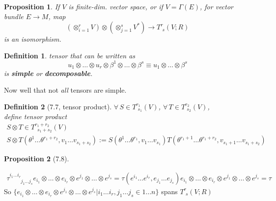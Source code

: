 \documentclass[10pt]{amsart}
\newtheorem{proposition}{Proposition}
\newtheorem{definition}{Definition}
\begin{document}
\begin{multicols*}{2}
\begin{proposition}
If $V$ is finite-dim. vector space, or if $V=\Gamma(E)$, for vector bundle $E\to M$, map
\begin{equation}
\left( \otimes_{i=1}^r V \right)  \otimes \left( \otimes_{j=1}^s V^* \right) \to T^r_{ \, \, s}(V;R)
\end{equation}
is an isomorphism.  
\end{proposition}

\begin{definition}
tensor that can be written as 
\begin{equation}
u_1\otimes \dots \otimes u_r \otimes \beta^1 \otimes \dots \otimes \beta^s \equiv u_1\otimes \dots \otimes \beta^s 
\end{equation}
is \textbf{simple} or \textbf{decomposable}.  
\end{definition}
Now well that not \emph{all} tensors are simple.  

\begin{definition}[7.7\cite{JLee2009}, tensor product]
$\forall \, S\in T^{r_1}_{ \,\, s_1}(V)$, $\forall \, T \in T^{r_2}_{ \,\, s_2}(V)$, \\
define tensor product 
\begin{equation}
\begin{gathered}
S\otimes T\in T^{r_1+r_2}_{ \, \, \, s_1+s_2}(V) \\
	S\otimes T( \theta^1\dots \theta^{r_1 + r_2}, v_1 \dots v_{s_1+s_2}) := S(\theta^1\dots \theta^{r_1}, v_1\dots v_{s_1})T(\theta^{r_1+1}\dots \theta^{r_1+r_2}, v_{s_1+1}\dots v_{s_1 + s_2} )
\end{gathered}
\end{equation}
\end{definition}

\begin{proposition}[7.8\cite{JLee2009}]
\end{proposition}







\[
\begin{gathered}
	\tau^{ i_1 \dots i_r }_{ \phantom{i_1 \dots i_r} j_1 \dots j_s} e_{i_1} \otimes \dots \otimes e_{i_r} \otimes e^{j_1}\otimes \dots \otimes e^{j_s} = \tau(e^{i_1} \dots e^{i_r}, e_{j_1} \dots e_{j_s} )e_{i_1} \otimes \dots \otimes e_{i_r} \otimes e^{j_1} \otimes \dots \otimes e^{j_s} = \tau 
\end{gathered}
\]
So $\lbrace e_{i_1}\otimes \dots \otimes e_{i_r} \otimes e^{j_1} \otimes \dots \otimes e^{j_s} | i_1 \dots i_{r}, j_1\dots j_s \in 1 \dots n \rbrace$ spans $T^r_{\,\, s}(V;R)$


\end{multicols*}
\end{document}
